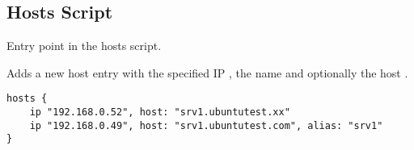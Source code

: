 \subsection{Hosts Script}




Entry point in the hosts script.


Adds a new host entry with the specified IP , the  
name and optionally the host .

\begin{lstlisting}[style=Java]
hosts {
    ip "192.168.0.52", host: "srv1.ubuntutest.xx"
    ip "192.168.0.49", host: "srv1.ubuntutest.com", alias: "srv1"
}
\end{lstlisting}
